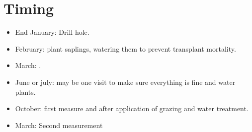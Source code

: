 \documentclass[12pt]{article} %
\begin{document}
\section{Timing}
\begin{itemize}

\item End January: Drill hole.
\item February: plant saplings, watering them to prevent transplant mortality.
\item March: .
\item June or july: may be one visit to make sure everything is fine and water plants.
\item October: first measure and after application of grazing and water treatment.
\item March: Second measurement

\end{itemize}

%

%
\printbibliography
\end{document}
